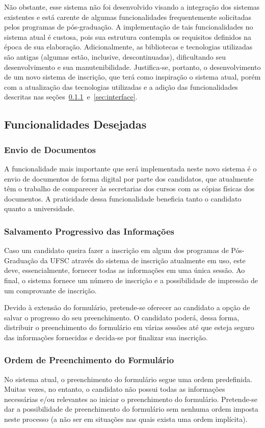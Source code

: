 \documentclass[
  10.5pt,				  %
	openright,			%
	twoside,			  %
  a5paper,
  chapter=TITLE,	%
	section=TITLE,	%
  hyphens,        %
	english,        %
	brazil          %
]{abntex2}
\begin{document}
Não obstante, esse sistema não foi desenvolvido visando a integração dos sistemas existentes e está carente de algumas funcionalidades frequentemente solicitadas pelos programas de pós-graduação. A implementação de tais funcionalidades no sistema atual é custosa, pois sua estrutura contempla os requisitos definidos na época de sua elaboração. Adicionalmente, as bibliotecas e tecnologias utilizadas são antigas (algumas estão, inclusive, descontinuadas), dificultando seu desenvolvimento e sua manutenibilidade. Justifica-se, portanto, o desenvolvimento de um novo sistema de inscrição, que terá como inspiração o sistema atual, porém com a atualização das tecnologias utilizadas e a adição das funcionalidades descritas nas seções~\ref{sec:envio_doc}~e~\ref{sec:interface}.

\subsection{Funcionalidades Desejadas}

\subsubsection{Envio de Documentos}\label{sec:envio_doc}
A funcionalidade mais importante que será implementada neste novo sistema é o envio de documentos de forma digital por parte dos candidatos, que atualmente têm o trabalho de comparecer às secretarias dos cursos com as cópias físicas dos documentos. A praticidade dessa funcionalidade beneficia tanto o candidato quanto a universidade.

\subsubsection{Salvamento Progressivo das Informações}
Caso um candidato queira fazer a inscrição em algum dos programas de Pós-Graduação da UFSC através do sistema de inscrição atualmente em uso, este deve, essencialmente, fornecer todas as informações em uma única sessão. Ao final, o sistema fornece um número de inscrição e a possibilidade de impressão de um comprovante de inscrição.

Devido à extensão do formulário, pretende-se oferecer ao candidato a opção de salvar o progresso do seu preenchimento. O candidato poderá, dessa forma, distribuir o preenchimento do formulário em várias sessões até que esteja seguro das informações fornecidas e decida-se por finalizar sua inscrição.

\subsubsection{Ordem de Preenchimento do Formulário}\label{sec:ordem}
No sistema atual, o preenchimento do formulário segue uma ordem predefinida. Muitas vezes, no entanto, o candidato não possui todas as informações necessárias e/ou relevantes ao iniciar o preenchimento do formulário. Pretende-se dar a possibilidade de preenchimento do formulário sem nenhuma ordem imposta neste processo (a não ser em situações nas quais exista uma ordem implícita).
\end{document}
